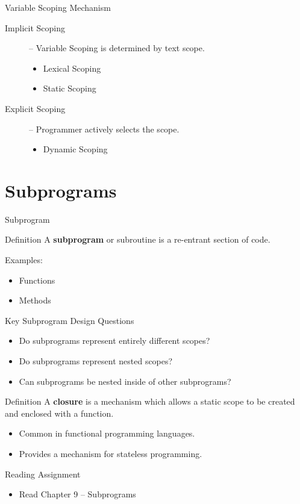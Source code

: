 \documentclass[handout]{beamer}
\begin{document}
\begin{frame}{Variable Scoping Mechanism}
    \begin{description}
        \item[Implicit Scoping] -- Variable Scoping is determined by text scope.
        \begin{itemize}
            \item Lexical Scoping
            \item Static Scoping
        \end{itemize}
        
        \item[Explicit Scoping] -- Programmer actively selects the scope.
        \begin{itemize}
            \item Dynamic Scoping
        \end{itemize}
    \end{description}
\end{frame}

\section{Subprograms}

\begin{frame}{Subprogram}
    \begin{block}{Definition}
        A \textbf{subprogram} or subroutine is a re-entrant section of code.
    \end{block}
    
    Examples:
    \begin{itemize}
        \item Functions 
        \item Methods
    \end{itemize}
\end{frame}

\begin{frame}{Key Subprogram Design Questions}
    \begin{itemize}
        \item Do subprograms represent entirely different scopes?
        \item Do subprograms represent nested scopes?
        \item Can subprograms be nested inside of other subprograms?
    \end{itemize}
\end{frame}


\begin{frame}
    \begin{block}{Definition}
        A \textbf{closure} is a mechanism which allows a static scope to be created and enclosed with a function.
    \end{block}
    \begin{itemize}
        \item Common in functional programming languages.
        \item Provides a mechanism for stateless programming.
    \end{itemize}
\end{frame}

\begin{frame}{Reading Assignment}
    \begin{itemize}
        \item Read Chapter 9 -- Subprograms
    \end{itemize}
\end{frame}
\end{document}
